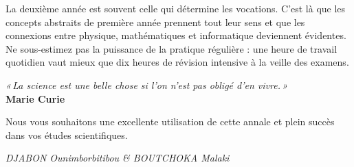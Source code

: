 \documentclass[12pt,a4paper]{article}
\begin{document}
La deuxième année est souvent celle qui détermine les vocations. C'est là que les concepts abstraits de première année prennent tout leur sens et que les connexions entre physique, mathématiques et informatique deviennent évidentes. Ne sous-estimez pas la puissance de la pratique régulière : une heure de travail quotidien vaut mieux que dix heures de révision intensive à la veille des examens.

\begin{flushright}
\emph{«\,La science est une belle chose si l'on n'est pas obligé d'en vivre.\,»}\\
\textbf{Marie Curie}
\end{flushright}

Nous vous souhaitons une excellente utilisation de cette annale et plein succès dans vos études scientifiques.

\vspace{1cm}
\begin{flushright}
\textit{DJABON Ounimborbitibou \& BOUTCHOKA Malaki}
\end{flushright}

\newpage
\tableofcontents
\newpage

\newpage
\thispagestyle{empty}
\newpage
\end{document}
